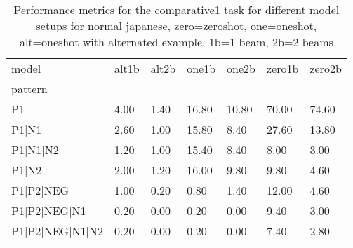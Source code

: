 \begin{table}[h]
\begin{tabular}{l|llllll}
\toprule
model & alt1b & alt2b & one1b & one2b & zero1b & zero2b \\
pattern &  &  &  &  &  &  \\
\midrule
P1 & 4.00 & 1.40 & 16.80 & 10.80 & 70.00 & 74.60 \\
P1|N1 & 2.60 & 1.00 & 15.80 & 8.40 & 27.60 & 13.80 \\
P1|N1|N2 & 1.20 & 1.00 & 15.40 & 8.40 & 8.00 & 3.00 \\
P1|N2 & 2.00 & 1.20 & 16.00 & 9.80 & 9.80 & 4.60 \\
P1|P2|NEG & 1.00 & 0.20 & 0.80 & 1.40 & 12.00 & 4.60 \\
P1|P2|NEG|N1 & 0.20 & 0.00 & 0.20 & 0.00 & 9.40 & 3.00 \\
P1|P2|NEG|N1|N2 & 0.20 & 0.00 & 0.20 & 0.00 & 7.40 & 2.80 \\
\bottomrule
\end{tabular}
\caption{Performance metrics for the comparative1 task for different model setups for normal japanese, zero=zeroshot, one=oneshot, alt=oneshot with alternated example, 1b=1 beam, 2b=2 beams}
\label{tab:ja norm_comparative1_performance}
\end{table}
